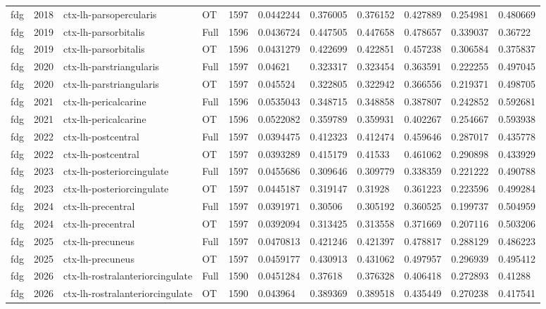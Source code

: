\begin{landscape}
\begin{longtable}{lllllllllll}
fdg & 2018 & ctx-lh-parsopercularis & OT & 1597 & 0.0442244 & 0.376005 & 0.376152 & 0.427889 & 0.254981 & 0.480669 \\
fdg & 2019 & ctx-lh-parsorbitalis & Full & 1596 & 0.0436724 & 0.447505 & 0.447658 & 0.478657 & 0.339037 & 0.36722 \\
fdg & 2019 & ctx-lh-parsorbitalis & OT & 1596 & 0.0431279 & 0.422699 & 0.422851 & 0.457238 & 0.306584 & 0.375837 \\
fdg & 2020 & ctx-lh-parstriangularis & Full & 1597 & 0.04621 & 0.323317 & 0.323454 & 0.363591 & 0.222255 & 0.497045 \\
fdg & 2020 & ctx-lh-parstriangularis & OT & 1597 & 0.045524 & 0.322805 & 0.322942 & 0.366556 & 0.219371 & 0.498705 \\
fdg & 2021 & ctx-lh-pericalcarine & Full & 1596 & 0.0535043 & 0.348715 & 0.348858 & 0.387807 & 0.242852 & 0.592681 \\
fdg & 2021 & ctx-lh-pericalcarine & OT & 1596 & 0.0522082 & 0.359789 & 0.359931 & 0.402267 & 0.254667 & 0.593938 \\
fdg & 2022 & ctx-lh-postcentral & Full & 1597 & 0.0394475 & 0.412323 & 0.412474 & 0.459646 & 0.287017 & 0.435778 \\
fdg & 2022 & ctx-lh-postcentral & OT & 1597 & 0.0393289 & 0.415179 & 0.41533 & 0.461062 & 0.290898 & 0.433929 \\
fdg & 2023 & ctx-lh-posteriorcingulate & Full & 1597 & 0.0455686 & 0.309646 & 0.309779 & 0.338359 & 0.221222 & 0.490788 \\
fdg & 2023 & ctx-lh-posteriorcingulate & OT & 1597 & 0.0445187 & 0.319147 & 0.31928 & 0.361223 & 0.223596 & 0.499284 \\
fdg & 2024 & ctx-lh-precentral & Full & 1597 & 0.0391971 & 0.30506 & 0.305192 & 0.360525 & 0.199737 & 0.504959 \\
fdg & 2024 & ctx-lh-precentral & OT & 1597 & 0.0392094 & 0.313425 & 0.313558 & 0.371669 & 0.207116 & 0.503206 \\
fdg & 2025 & ctx-lh-precuneus & Full & 1597 & 0.0470813 & 0.421246 & 0.421397 & 0.478817 & 0.288129 & 0.486223 \\
fdg & 2025 & ctx-lh-precuneus & OT & 1597 & 0.0459177 & 0.430913 & 0.431062 & 0.497957 & 0.296939 & 0.495412 \\
fdg & 2026 & ctx-lh-rostralanteriorcingulate & Full & 1590 & 0.0451284 & 0.37618 & 0.376328 & 0.406418 & 0.272893 & 0.41288 \\
fdg & 2026 & ctx-lh-rostralanteriorcingulate & OT & 1590 & 0.043964 & 0.389369 & 0.389518 & 0.435449 & 0.270238 & 0.417541 \\

\end{longtable}
\end{landscape}
